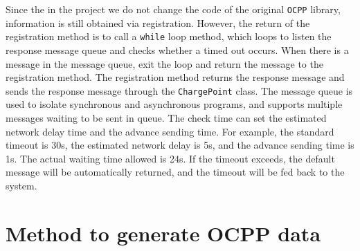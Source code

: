 \documentclass[
english,
ruledheaders=section,%
class=report,%
thesis={type=Report},%
accentcolor=9c,%
custommargins=true,%
marginpar=false,%
parskip=half-,%
fontsize=11pt,%
logofile={img/tuda_logo.pdf}, %
]{tudapub}
\begin{document}


    Since the in the project we do not change the code of the original \texttt{OCPP} library, information is still obtained via registration. However, the return of the registration method is to call a \texttt{while} loop method, which loops to listen the response message queue and checks whether a timed out occurs. When there is a message in the message queue, exit the loop and return the message to the registration method. The registration method returns the response message and sends the response message through the \texttt{ChargePoint} class. The message queue is used to isolate synchronous and asynchronous programs, and supports multiple messages waiting to be sent in queue. The check time can set the estimated network delay time and the advance sending time. For example, the standard timeout is 30s, the estimated network delay is 5s, and the advance sending time is 1s. The actual waiting time allowed is 24s. If the timeout exceeds, the default message will be automatically returned, and the timeout will be fed back to the system.

    \section{Method to generate OCPP data}
    \label{sec:ocppGenerator}
\end{document}
